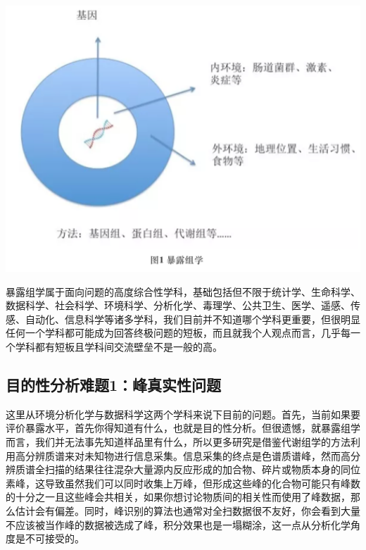 \documentclass[]{book}
\begin{document}
\includegraphics[width=6.67in]{images/expo1}

暴露组学属于面向问题的高度综合性学科，基础包括但不限于统计学、生命科学、数据科学、社会科学、环境科学、分析化学、毒理学、公共卫生、医学、遥感、传感、自动化、信息科学等诸多学科，我们目前并不知道哪个学科更重要，但很明显任何一个学科都可能成为回答终极问题的短板，而且就我个人观点而言，几乎每一个学科都有短板且学科间交流壁垒不是一般的高。

\hypertarget{ux76eeux7684ux6027ux5206ux6790ux96beux98981ux5cf0ux771fux5b9eux6027ux95eeux9898}{%
\subsection{目的性分析难题1：峰真实性问题}\label{ux76eeux7684ux6027ux5206ux6790ux96beux98981ux5cf0ux771fux5b9eux6027ux95eeux9898}}

这里从环境分析化学与数据科学这两个学科来说下目前的问题。首先，当前如果要评价暴露水平，首先你得知道有什么，也就是目的性分析。但很遗憾，就暴露组学而言，我们并无法事先知道样品里有什么，所以更多研究是借鉴代谢组学的方法利用高分辨质谱来对未知物进行信息采集。信息采集的终点是色谱质谱峰，然而高分辨质谱全扫描的结果往往混杂大量源内反应形成的加合物、碎片或物质本身的同位素峰，这导致虽然我们可以同时收集上万峰，但形成这些峰的化合物可能只有峰数的十分之一且这些峰会共相关，如果你想讨论物质间的相关性而使用了峰数据，那么估计会有偏差。同时，峰识别的算法也通常对全扫数据很不友好，你会看到大量不应该被当作峰的数据被选成了峰，积分效果也是一塌糊涂，这一点从分析化学角度是不可接受的。
\end{document}
